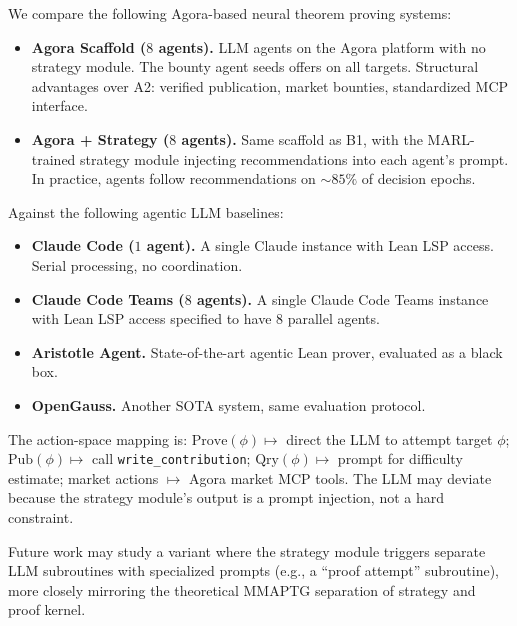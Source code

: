 We compare the following Agora-based neural theorem proving systems:
\begin{itemize}
    \item[\textbf{B1.}] \textbf{Agora Scaffold ($8$ agents).} LLM agents on the Agora platform with no strategy module. The bounty agent seeds offers on all targets. Structural advantages over A2: verified publication, market bounties, standardized MCP interface.
    \item[\textbf{C1.}] \textbf{Agora + Strategy ($8$ agents).} Same scaffold as B1, with the MARL-trained strategy module injecting recommendations into each agent's prompt. In practice, agents follow recommendations on $\sim\!85\%$ of decision epochs.
\end{itemize}

Against the following agentic LLM baselines:
\begin{itemize}
    \item[\textbf{A1.}] \textbf{Claude Code ($1$ agent).} A single Claude instance with Lean LSP access. Serial processing, no coordination.
    \item[\textbf{A2.}] \textbf{Claude Code Teams ($8$ agents).} A single Claude Code Teams instance with Lean LSP access specified to have 8 parallel agents.
    \item[\textbf{A3.}] \textbf{Aristotle Agent.} State-of-the-art agentic Lean prover, evaluated as a black box.
    \item[\textbf{A4.}] \textbf{OpenGauss.} Another SOTA system, same evaluation protocol.
\end{itemize}


\begin{remark}
The action-space mapping is: $\mathrm{Prove}(\phi) \mapsto$ direct the LLM to attempt target $\phi$; $\mathrm{Pub}(\phi) \mapsto$ call \texttt{write\_contribution}; $\mathrm{Qry}(\phi) \mapsto$ prompt for difficulty estimate; market actions $\mapsto$ Agora market MCP tools. The LLM may deviate because the strategy module's output is a prompt injection, not a hard constraint.
\end{remark}

\begin{remark}
Future work may study a variant where the strategy module triggers separate LLM subroutines with specialized prompts (e.g., a ``proof attempt'' subroutine), more closely mirroring the theoretical MMAPTG separation of strategy and proof kernel.
\end{remark}


